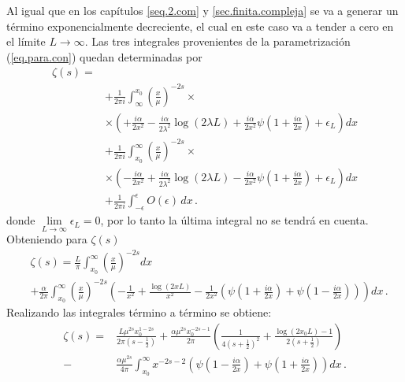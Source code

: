 Al igual que en los capítulos \ref{seq.2.com} y  \ref{sec.finita.compleja} se va a generar un término exponencialmente decreciente, el cual en este caso va a tender a cero en el límite $L \rightarrow \infty$. Las tres integrales provenientes de la parametrización (\ref{eq.para.con}) quedan determinadas por 
\begin{align}
\zeta (s) =& \\
& +
\nonumber
	\frac{ 1 }{2 \pi i}  
	\int _{\infty} ^{x _0} 
	\left( \frac{x}{\mu} \right) ^{-2s} \times
\\
&
\nonumber
	\times
	\left( +
	\frac{i \alpha}{2 x^2} - 
	\frac{i \alpha }{2 \lambda ^2} \log ( 2 \lambda L ) +
	\frac{i \alpha}{2 x ^2 } \psi \left( 1 + \frac{i \alpha}{2 x} \right) +
	\epsilon _L
	\right)
	d x
\label{int1}	
\\
\nonumber
& +
	\frac{ 1 }{2 \pi i}  
	\int _{x _0} ^{\infty} 
	\left( \frac{x}{\mu} \right) ^{-2s}
	\times
\\
&
	\times	
	\left( -
	\frac{i \alpha}{2 x^2} + 
	\frac{i \alpha }{2 \lambda ^2} \log ( 2 \lambda L ) -
	\frac{i \alpha}{2 x ^2 } \psi \left( 1 + \frac{i \alpha}{2 x} \right) +
	\epsilon _L
	\right)
	d x
\nonumber
\\
& +
\nonumber
	\frac{ 1 }{2 \pi i}	
	\int _{- \epsilon} ^{\epsilon}
	O (\epsilon) \, dx
\, .	
\end{align}
donde $\lim \limits _{L \rightarrow \infty} \epsilon _L = 0$, por lo tanto la última integral no se tendrá en cuenta. Obteniendo para $\zeta(s) $
\begin{align}
&
	\zeta (s)=
	\frac{L }{\pi}
	\int _ {x_0} ^{\infty} \left( \frac{x}{\mu} \right) ^{-2s} dx
\\	 
& 
\nonumber
	+
	\frac{\alpha }{2 \pi } \int _{x_0} ^{\infty} 
	\left( \frac{x}{\mu} \right) ^{-2s}
	\left(-
	\frac{1}{ x ^2} +
	\frac{\log \left( 2 x L \right) }{x ^2}  -
	\frac{1}{ 2 x ^2 } 
	\left(
	\psi \left( 1 + \frac{i \alpha}{2  x} \right) + \psi \left( 1 - \frac{i \alpha}{2 x} \right) 
	\right)
	\right)
	d x
	\, .
\end{align}
Realizando las integrales término a término se obtiene:
\begin{align}
	\zeta (s)=
&
\nonumber
	\frac{L  \mu ^{2s} x _0 ^{1-2s} }{2 \pi \left( s- \frac{1}{2} \right)}  + 
	\frac{\alpha \mu ^{2s} x _{0} ^{-2s-1} }{2 \pi} 
	\left( 
	\frac{1}{4 \left(s+ \frac{1}{2} \right) ^2} +
	\frac{\log(2 x _0 L) -1 }{2 \left(s+\frac{1}{2} \right)} 
	\right) 
\\
-
&	
	\frac{\alpha \mu ^{2s} }{4 \pi}
	\int _{x_0} ^{\infty} 
	x ^{-2s-2}
	\left(
	\psi \left( 1 - \frac{i \alpha}{2 x} \right) +
	\psi \left( 1 + \frac{i \alpha}{2 x} \right)
	\right)
	dx
\, .
\end{align}
